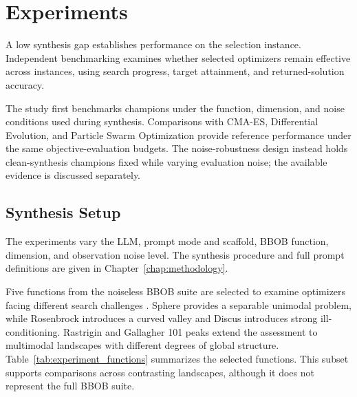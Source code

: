 \chapter{Experiments}
\label{chap:experiments}

A low synthesis gap establishes performance on the selection instance.
Independent benchmarking examines whether selected optimizers remain
effective across instances, using search progress, target attainment,
and returned-solution accuracy.

The study first benchmarks champions under the function, dimension, and
noise conditions used during synthesis. Comparisons with CMA-ES,
Differential Evolution, and Particle Swarm Optimization provide reference
performance under the same objective-evaluation budgets. The noise-robustness design instead holds clean-synthesis champions
fixed while varying evaluation noise; the available evidence is discussed
separately.

\section{Synthesis Setup}
\label{sec:experimental_design}

The experiments vary the LLM, prompt mode and scaffold, BBOB function,
dimension, and observation noise level. The synthesis procedure and
full prompt definitions are given in
Chapter~\ref{chap:methodology}.

Five functions from the noiseless BBOB suite are selected to examine
optimizers facing different search challenges
\cite{BBOB2009,Hansen2021COCO}. Sphere provides a separable unimodal
problem, while Rosenbrock introduces a curved valley and Discus introduces
strong ill-conditioning. Rastrigin and Gallagher 101 peaks extend the
assessment to multimodal landscapes with different degrees of global
structure. Table~\ref{tab:experiment_functions} summarizes the selected
functions. This subset supports comparisons across contrasting landscapes,
although it does not represent the full BBOB suite.

